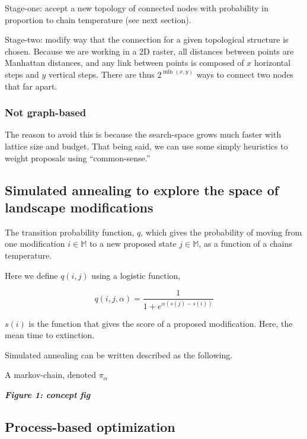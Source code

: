 \documentclass[10pt,oneside]{article}
\begin{document}
Stage-one: accept a new topology of connected nodes with probability in
proportion to chain temperature (see next section).

Stage-two: modify way that the connection for a given topological
structure is chosen. Because we are working in a 2D raster, all
distances between points are Manhattan distances, and any link between
points is composed of \(x\) horizontal steps and \(y\) vertical steps.
There are thus \(2^{\min(x,y)}\) ways to connect two nodes that far
apart.

\hypertarget{not-graph-based}{%
\subsubsection{Not graph-based}\label{not-graph-based}}

The reason to avoid this is because the search-space grows much faster
with lattice size and budget. That being said, we can use some simply
heuristics to weight proposals using ``common-sense.''

\hypertarget{simulated-annealing-to-explore-the-space-of-landscape-modifications}{%
\subsection{Simulated annealing to explore the space of landscape
modifications}\label{simulated-annealing-to-explore-the-space-of-landscape-modifications}}

The transition probability function, \(q\), which gives the probability
of moving from one modification \(i \in \mathbb{M}\) to a new proposed
state \(j \in \mathbb{M}\), as a function of a chains temperature.

Here we define \(q(i,j)\) using a logistic function,

\[q(i,j, \alpha) = \frac{1}{1 + e^{\alpha (s(j) - s(i))}}\]

\(s(i)\) is the function that gives the score of a proposed
modification. Here, the mean time to extinction.

Simulated annealing can be written described as the following.

A markov-chain, denoted \(\pi_\alpha\)

\textbf{\emph{Figure 1: concept fig}}

\hypertarget{process-based-optimization}{%
\subsection{Process-based
optimization}\label{process-based-optimization}}
\end{document}
